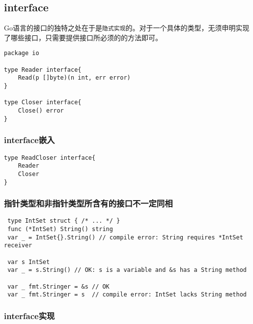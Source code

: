 \hypertarget{interface}{%
\subsection{interface}\label{interface}}

Go语言的接口的独特之处在于是\texttt{隐式实现}的。对于一个具体的类型，无须申明实现了哪些接口，只需要提供接口所必须的的方法即可。

\begin{verbatim}
package io

type Reader interface{
    Read(p []byte)(n int, err error)
}

type Closer interface{
    Close() error
}
\end{verbatim}

\hypertarget{interfaceux5d4cux5165}{%
\subsubsection{interface嵌入}\label{interfaceux5d4cux5165}}

\begin{verbatim}
type ReadCloser interface{
    Reader
    Closer
}
\end{verbatim}

\hypertarget{ux6307ux9488ux7c7bux578bux548cux975eux6307ux9488ux7c7bux578bux6240ux542bux6709ux7684ux63a5ux53e3ux4e0dux4e00ux5b9aux540cux76f8}{%
\subsubsection{指针类型和非指针类型所含有的接口不一定同相}\label{ux6307ux9488ux7c7bux578bux548cux975eux6307ux9488ux7c7bux578bux6240ux542bux6709ux7684ux63a5ux53e3ux4e0dux4e00ux5b9aux540cux76f8}}

\begin{verbatim}
 type IntSet struct { /* ... */ }
 func (*IntSet) String() string
 var _ = IntSet{}.String() // compile error: String requires *IntSet receiver
  
 var s IntSet
 var _ = s.String() // OK: s is a variable and &s has a String method
 
 var _ fmt.Stringer = &s // OK
 var _ fmt.Stringer = s  // compile error: IntSet lacks String method
\end{verbatim}

\hypertarget{interfaceux5b9eux73b0}{%
\subsubsection{interface实现}\label{interfaceux5b9eux73b0}}

